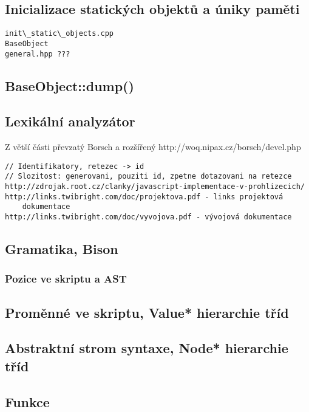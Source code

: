 \documentclass[11pt,twoside,a4paper]{book}
\begin{document}
\subsection{Inicializace statických objektů a úniky paměti}

\begin{verbatim}
init\_static\_objects.cpp
BaseObject
general.hpp ???
\end{verbatim}


\subsection{BaseObject::dump()}

\subsection{Lexikální analyzátor}

Z větší části převzatý Borsch a rozšířený
http://woq.nipax.cz/borsch/devel.php

\begin{verbatim}
// Identifikatory, retezec -> id
// Slozitost: generovani, pouziti id, zpetne dotazovani na retezce
http://zdrojak.root.cz/clanky/javascript-implementace-v-prohlizecich/
http://links.twibright.com/doc/projektova.pdf - links projektová
	dokumentace
http://links.twibright.com/doc/vyvojova.pdf - vývojová dokumentace
\end{verbatim}


\subsection{Gramatika, Bison}

\subsubsection{Pozice ve skriptu a AST}


\subsection{Proměnné ve skriptu, Value* hierarchie tříd}

\subsection{Abstraktní strom syntaxe, Node* hierarchie tříd}


\subsection{Funkce}
\end{document}
